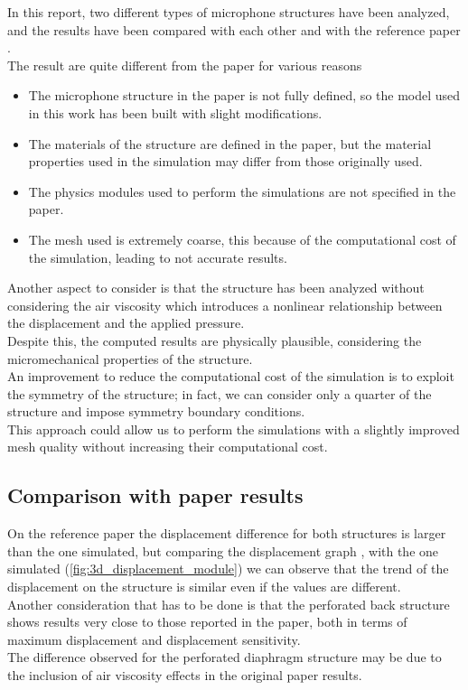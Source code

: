 
In this report, two different types of microphone structures have been analyzed, and the results have been compared with each other and with the reference paper \cite{krishnapriya2014}. \\
The result are quite different from the paper for various reasons

\begin{itemize}
    \item The microphone structure in the paper is not fully defined, so the model used in this work has been built with slight modifications.
    \item The materials of the structure are defined in the paper, but the material properties used in the simulation may differ from those originally used.
    \item The physics modules used to perform the simulations are not specified in the paper.
    \item The mesh used is extremely coarse, this because of the computational cost of the simulation, leading to not accurate results.
\end{itemize}

\noindent
Another aspect to consider is that the structure has been analyzed without considering the air viscosity which introduces a nonlinear relationship between the displacement and the applied pressure. \\
Despite this, the computed results are physically plausible, considering the micromechanical properties of the structure. \\
An improvement to reduce the computational cost of the simulation is to exploit the symmetry of the structure; in fact, we can consider only a quarter of the structure and impose symmetry boundary conditions. \\
This approach could allow us to perform the simulations with a slightly improved mesh quality without increasing their computational cost.

\subsection{Comparison with paper results}

On the reference paper the displacement difference for both structures is larger than the one simulated, but comparing the displacement graph \cite[p.~3, Fig.~3 and Fig.~5]{krishnapriya2014}, with the one simulated (\autoref{fig:3d_displacement_module}) we can observe that the trend of the displacement on the structure is similar even if the values are different. \\
Another consideration that has to be done is that the perforated back structure shows results very close to those reported in the paper, both in terms of maximum displacement and displacement sensitivity. \\
The difference observed for the perforated diaphragm structure may be due to the inclusion of air viscosity effects in the original paper results.

